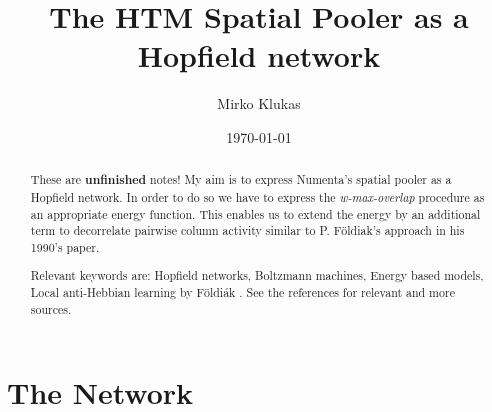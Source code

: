 \documentclass[titlepage]{amsart}
\theoremstyle{definition}
\begin{document}
\title[]{The HTM Spatial Pooler as a Hopfield network}


\author{Mirko Klukas}
\address[Mirko~Klukas]{Institute of Science and Technology Austria (IST Austria), 
Am Campus 1,
A – 3400 Klosterneuburg, Austria}
\date{\today}

%  
\begin{abstract}
These are \textbf{unfinished} notes!
My aim is to express Numenta's spatial pooler as a Hopfield network.
In order to do so we have to express the \textit{w-max-overlap} procedure as
an appropriate energy function. This enables us to extend 
the energy by an additional term to decorrelate pairwise column activity
similar to P. Földiak's approach in his 1990's paper.

Relevant keywords are:
Hopfield networks, Boltzmann machines, Energy based models, Local anti-Hebbian learning by F\"oldi\'ak \cite{foldiak}.
See the references for relevant and more sources.
\end{abstract}
%
\maketitle
\tableofcontents
% 

% 
% 
\section{The Network}
% 
% 
% 
\end{document}
